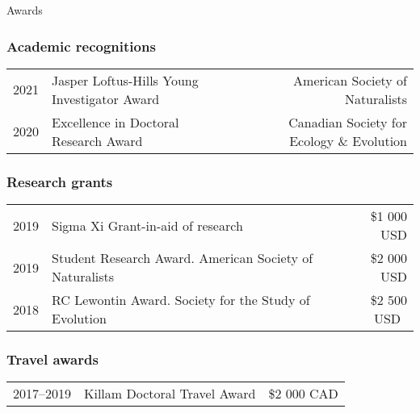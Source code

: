 \documentclass[11pt]{article}
\begin{document}
\begin{rSection}{Awards}
\subsubsection*{Academic recognitions}
\begin{tabular}{llr}

2021 & Jasper Loftus-Hills Young Investigator Award & American Society of Naturalists\\
2020 & Excellence in Doctoral Research Award & Canadian Society for Ecology \& Evolution\\

\end{tabular}


\subsubsection*{Research grants}
\begin{tabular}{llr}

2019 & Sigma Xi Grant-in-aid of research & \$1 000 USD\\
2019 & Student Research Award. American Society of Naturalists & \$2 000 USD\\
2018 & RC Lewontin Award. Society for the Study of Evolution & \$2 500 USD\

\end{tabular}

\subsubsection*{Travel awards}
\begin{tabular}{llr}
2017--2019 & Killam Doctoral Travel Award  & \$2 000 CAD\\ %
\end{tabular}


\end{rSection}
\end{document}
